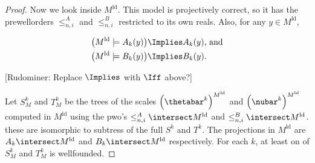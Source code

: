 \documentclass[oneside,12pt]{amsart}
\begin{document}
\begin{proof}
Now we look inside $M^{\text{ld}}$. This model is projectively correct, so it
has the prewellorders $\leq^A_{n,i}$ and $\leq^B_{n,i}$ restricted to its own
reals. Also, for any $y\in M^{\text{ld}}$,

\begin{align*}
\left( M^{\text{ld}} \models A_k(y)  \right) &\Implies A_k(y) \text{, and} \\
\left( M^{\text{ld}} \models B_k(y)  \right) &\Implies B_k(y).
\end{align*}

[Rudominer: Replace $\Implies$ with $\Iff$ above?]

Let $S^k_{M}$ and $T^k_{M}$ be the trees of the scales
$\left( \thetabar^k \right)^{M^{\text{ld}}}$ and
$\left( \nubar^k \right)^{M^{\text{ld}}}$ computed in ${M^{\text{ld}}}$
using the pwo's $\leq^A_{n,i}\intersect M^{\text{ld}}$ and
$\leq^B_{n,i}\intersect M^{\text{ld}}$. these are isomorphic to subtress
of the full $S^k$ and $T^k$. The projections in $M^{\text{ld}}$ are
$A_k\intersect M^{\text{ld}}$ and
$B_k\intersect M^{\text{ld}}$ respectively. For each $k$, at least on of
$S^k_{M}$ and $T^k_{M}$ is wellfounded.

\end{proof}




\end{document}
